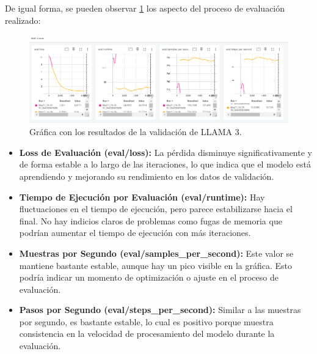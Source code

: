 \bigskip %

De igual forma, se pueden observar \ref{fig:5_LLAMA_Grafico_Val.png}{} los aspecto del proceso de evaluación realizado:

\begin{figure}[htbp!]
  \centering
  \includegraphics[width=\textwidth,keepaspectratio]{imaxes/5_LLAMA_Grafico_Val.png}
  \caption{Gráfica con los resultados de la validación de LLAMA 3.}
  \label{fig:5_LLAMA_Grafico_Val.png}
\end{figure}

\bigskip %

\begin{itemize}
    \item \textbf{Loss de Evaluación (eval/loss):} La pérdida disminuye significativamente y de forma estable a lo largo de las iteraciones, lo que indica que el modelo está aprendiendo y mejorando su rendimiento en los datos de validación.

    \item \textbf{Tiempo de Ejecución por Evaluación (eval/runtime):} Hay fluctuaciones en el tiempo de ejecución, pero parece estabilizarse hacia el final. No hay indicios claros de problemas como fugas de memoria que podrían aumentar el tiempo de ejecución con más iteraciones.

    \item \textbf{Muestras por Segundo (eval/samples\_per\_second):} Este valor se mantiene bastante estable, aunque hay un pico visible en la gráfica. Esto podría indicar un momento de optimización o ajuste en el proceso de evaluación.

    \item \textbf{Pasos por Segundo (eval/steps\_per\_second):} Similar a las muestras por segundo, es bastante estable, lo cual es positivo porque muestra consistencia en la velocidad de procesamiento del modelo durante la evaluación.
\end{itemize}

\bigskip %

